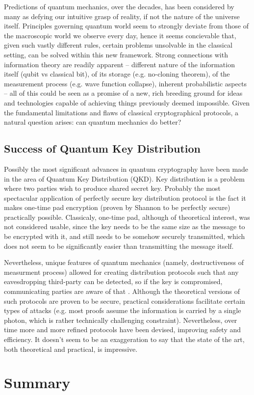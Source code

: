 \documentclass[10pt]{article}
\begin{document}
Predictions of quantum mechanics, over the decades, has been considered by many as defying our intuitive
grasp of reality, if not the nature of the universe itself. Principles governing quantum world seem to
strongly deviate from those of the macroscopic world we observe every day, hence it seems concievable
that, given such vastly different rules, certain problems unsolvable in the classical setting, can be
solved within this new framework. Strong connections with information theory are readily apparent -- 
different nature of the information itself (qubit vs classical bit), of its storage (e.g. no-cloning 
theorem), of the measurement process (e.g. wave function collapse), inherent probabilistic aspects --
all of this could be seen as a promise of a new, rich breeding ground for ideas and technologies
capable of achieving things previously deemed impossible. Given the fundamental limitations and flaws
of classical cryptographical protocols, a natural question arises: can quantum mechanics do better?

\subsection*{Success of Quantum Key Distribution}

Possibly the most significant advances in quantum cryptography have been made in the area of Quantum
Key Distribution (QKD). Key distribution is a problem where two parties wish to produce shared secret
key. Probably the most spectacular application of perfectly secure key distribution protocol is the
fact it makes one-time pad encryption (proven by Shannon to be perfectly secure) practically possible.
Classicaly, one-time pad, although of theoretical interest, was not considered usable, since the
key needs to be the same size as the message to be encrypted with it, and still needs to be somehow 
securely transmitted, which does not seem to be significantly easier than transmitting the message
itself.

Nevertheless, unique features of quantum mechanics (namely, destructiveness of measurment process)
allowed  for creating distribution protocols such that any eavesdropping third-party can be detected,
so if the key is compromised, communicating parties are aware of that \cite{bb84}. Although the
theoretical versions of such protocols are proven to be secure, practical considerations facilitate
certain types of attacks (e.g. most proofs assume the information is carried by a single photon,
which is rather technically challenging constraint). Nevertheless, over time more and more refined
protocols have been devised, improving safety and efficiency. It doesn't seem to be an exaggeration 
to say that the state of the art, both theoretical and practical, is impressive.


\section{Summary}

\nocite{*}



\end{document}

